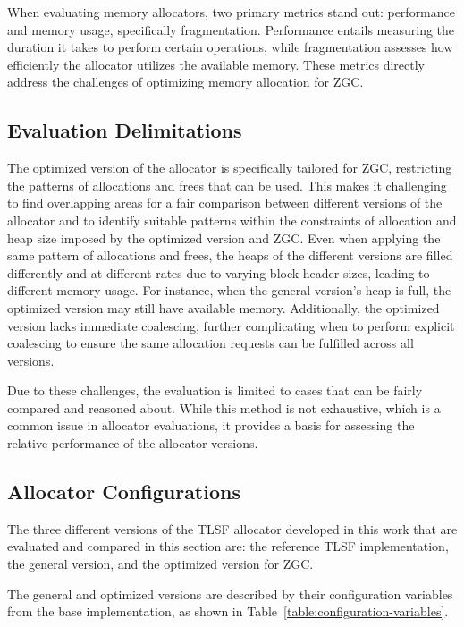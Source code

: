 
When evaluating memory allocators, two primary metrics stand out: performance and memory usage, specifically fragmentation. Performance entails measuring the duration it takes to perform certain operations, while fragmentation assesses how efficiently the allocator utilizes the available memory. These metrics directly address the challenges of optimizing memory allocation for ZGC.

\subsection{Evaluation Delimitations}

The optimized version of the allocator is specifically tailored for ZGC, restricting the patterns of allocations and frees that can be used. This makes it challenging to find overlapping areas for a fair comparison between different versions of the allocator and to identify suitable patterns within the constraints of allocation and heap size imposed by the optimized version and ZGC. Even when applying the same pattern of allocations and frees, the heaps of the different versions are filled differently and at different rates due to varying block header sizes, leading to different memory usage. For instance, when the general version's heap is full, the optimized version may still have available memory. Additionally, the optimized version lacks immediate coalescing, further complicating when to perform explicit coalescing to ensure the same allocation requests can be fulfilled across all versions.

Due to these challenges, the evaluation is limited to cases that can be fairly compared and reasoned about. While this method is not exhaustive, which is a common issue in allocator evaluations, it provides a basis for assessing the relative performance of the allocator versions.

\subsection{Allocator Configurations}

The three different versions of the TLSF allocator developed in this work that are evaluated and compared in this section are: the reference TLSF implementation, the general version, and the optimized version for ZGC. 

The general and optimized versions are described by their configuration variables from the base implementation, as shown in Table~\ref{table:configuration-variables}.

